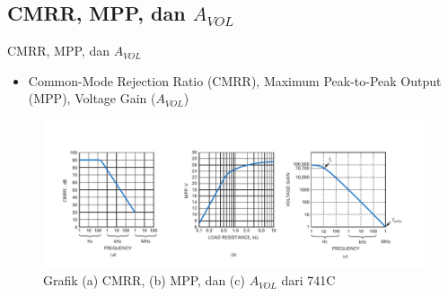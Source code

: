 \subsection{CMRR, MPP, dan $A_{VOL}$}
\begin{frame}{CMRR, MPP, dan $A_{VOL}$}
	\begin{itemize}
		\item Common-Mode Rejection Ratio (CMRR), Maximum Peak-to-Peak Output (MPP), Voltage Gain ($A_{VOL}$)
	\end{itemize}
	\begin{figure}
		\centering
		\includegraphics[width=0.9\linewidth]{gambar/fig-16.07}
		\caption{Grafik (a) CMRR, (b) MPP, dan (c) $A_{VOL}$ dari 741C}
		\label{fig:fig-16}
	\end{figure}
	\vfill\null
\end{frame}